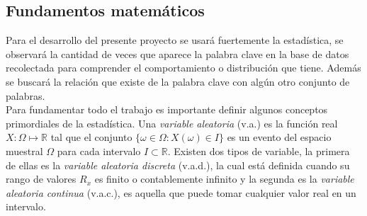 \subsection {Fundamentos matemáticos}
Para el desarrollo del presente proyecto se usará fuertemente la estadística, se observará la cantidad de veces que aparece la palabra clave en la base de datos recolectada para comprender el comportamiento o distribución que tiene. Además se buscará la relación que existe de la palabra clave con algún otro conjunto de palabras.\\

\noindent Para fundamentar todo el trabajo es importante definir algunos conceptos primordiales de la estadística.  Una  \emph{variable aleatoria} (v.a.) es la función real $X: \Omega\mapsto\mathbb{R}$ tal que el conjunto $\{\omega\in\Omega:X(\omega)\in I\}$ es un evento del espacio muestral $\Omega$ para cada intervalo $I\subset\mathbb{R}$. Existen dos tipos de variable, la primera de ellas es la \emph{variable aleatoria discreta} (v.a.d.), la cual está definida  cuando su rango de valores $R_x$ es finito o contablemente infinito y la segunda es la \emph{variable aleatoria continua} (v.a.c.), es aquella que puede tomar cualquier valor real en un intervalo.\\




